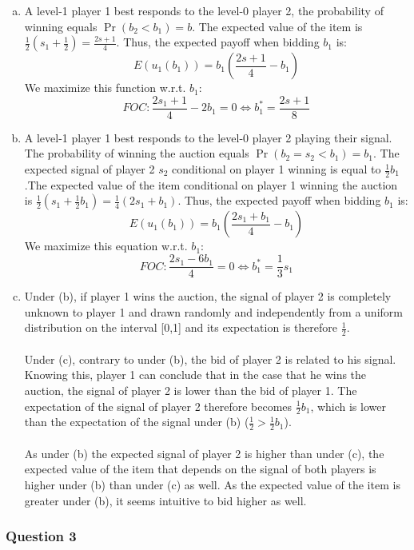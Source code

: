 \documentclass[a4paper]{article}
\begin{document}
\begin{enumerate}[(a)]
\item
A level-1 player 1 best responds to the level-0 player 2, the probability of winning equals $\Pr(b_2<b_1)=b$.
The expected value of the item is $\frac{1}{2}(s_1+\frac{1}{2})=\frac{2s+1}{4}$.
Thus, the expected payoff when bidding $b_1$ is: 
\[E(u_1(b_1))=b_1\left(\frac{2s+1}{4}-b_1\right)\]
We maximize this function w.r.t. $b_1$:
$$FOC: \frac{2s_1+1}{4}-2b_1=0 \iff b_1^*=\frac{2s+1}{8}$$
\item
A level-1 player 1 best responds to the level-0 player 2 playing their signal. The probability of winning the auction equals $\Pr(b_2=s_2<b_1)=b_1$. The expected signal of player 2 $s_2$ conditional on player 1 winning is equal to $\frac{1}{2}b_1$.The expected value of the item conditional on player 1 winning the auction is $\frac{1}{2}(s_1+\frac{1}{2}b_1)=\frac{1}{4}(2s_1+b_1)$. Thus, the expected payoff when bidding $b_1$ is:
$$E(u_1(b_1))=b_1\left(\frac{2s_1+b_1}{4}-b_1\right)$$
We maximize this equation w.r.t. $b_1$:
$$FOC: \frac{2s_1-6b_1}{4}=0 \iff b_1^*=\frac{1}{3}s_1$$
\item
Under (b), if player 1 wins the auction, the signal of player 2 is completely unknown to player 1 and drawn randomly and independently from a uniform distribution on the interval [0,1] and its expectation is therefore $\frac{1}{2}$. 
\\ \\
Under (c), contrary to under (b), the bid of player 2 is related to his signal. Knowing this, player 1 can conclude that in the case that he wins the auction, the signal of player 2 is lower than the bid of player 1. The expectation of the signal of player 2 therefore becomes $\frac{1}{2}b_1$, which is lower than the expectation of the signal under (b) ($\frac{1}{2}>\frac{1}{2}b_1$). 
\\ \\
As under (b) the expected signal of player 2 is higher than under (c), the expected value of the item that depends on the signal of both players is higher under (b) than under (c) as well. As the expected value of the item is greater under (b), it seems intuitive to bid higher as well. 
\end{enumerate}
\subsubsection{Question 3}
\end{document}
